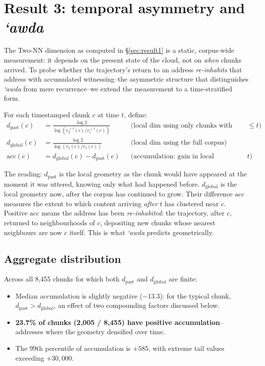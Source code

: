 \documentclass[11pt,a4paper]{article}
\theoremstyle{definition}
\newcommand{\dpast}{d_{\mathrm{past}}}
\newcommand{\dglobal}{d_{\mathrm{global}}}
\begin{document}
\section{Result 3: temporal asymmetry and \emph{`awda}}
\label{sec:result3}

The Two-NN dimension as computed in \S\ref{sec:result1} is a static,
corpus-wide measurement: it depends on the present state of the cloud,
not on \emph{when} chunks arrived. To probe whether the trajectory's
return to an address \emph{re-inhabits} that address with accumulated
witnessing--the asymmetric structure that distinguishes \emph{`awda}
from mere recurrence--we extend the measurement to a time-stratified
form.

For each timestamped chunk $c$ at time $t$, define:
\begin{align*}
\dpast(c)
  &= \tfrac{\log 2}{\log(r_2^{<t}(c) / r_1^{<t}(c))}
   && \text{(local dim using only chunks with timestamp $\leq t$)} \\
\dglobal(c)
  &= \tfrac{\log 2}{\log(r_2(c) / r_1(c))}
   && \text{(local dim using the full corpus)} \\
\mathrm{acc}(c)
  &= \dglobal(c) - \dpast(c)
   && \text{(accumulation: gain in local stratification after $t$)}
\end{align*}

The reading: $\dpast$ is the local geometry as the chunk would have
appeared at the moment it was uttered, knowing only what had happened
before. $\dglobal$ is the local geometry now, after the corpus has
continued to grow. Their difference $\mathrm{acc}$ measures the extent
to which content arriving \emph{after} $t$ has clustered near $c$.
Positive $\mathrm{acc}$ means the address has been \emph{re-inhabited}:
the trajectory, after $c$, returned to neighbourhoods of $c$, depositing
new chunks whose nearest neighbours are now $c$ itself. This is what
\emph{`awda} predicts geometrically.

\subsection{Aggregate distribution}

Across all 8{,}455 chunks for which both $\dpast$ and $\dglobal$ are
finite:
\begin{itemize}
\item Median accumulation is slightly negative ($-13.3$): for the
  typical chunk, $\dpast > \dglobal$, an effect of two compounding
  factors discussed below.
\item \textbf{23.7\% of chunks (2{,}005 / 8{,}455) have positive
  accumulation}--addresses where the geometry densified over time.
\item The 99th percentile of accumulation is $+585$, with extreme tail
  values exceeding $+30{,}000$.
\end{itemize}
\end{document}
